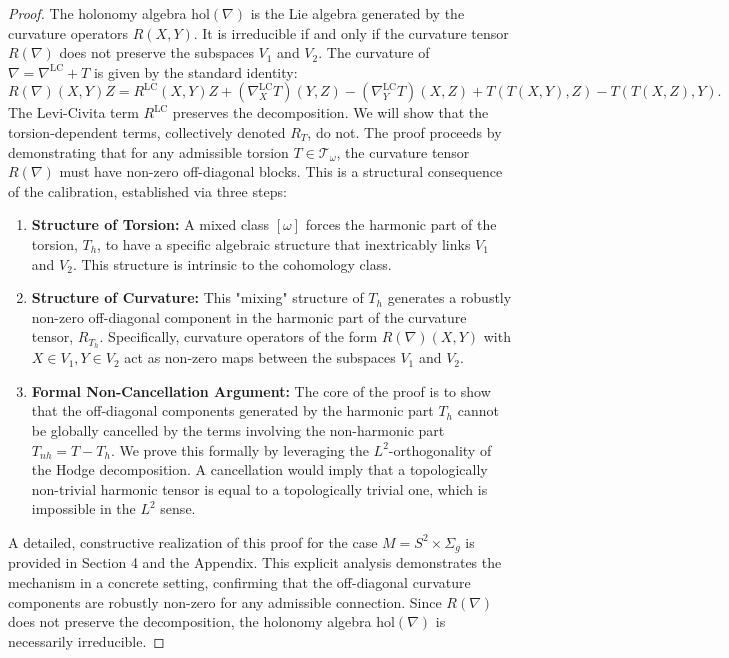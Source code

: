 \documentclass[12pt]{article}
\begin{document}
\begin{proof}
The holonomy algebra $\mathrm{hol}(\nabla)$ is the Lie algebra generated by the curvature operators $R(X,Y)$. It is irreducible if and only if the curvature tensor $R(\nabla)$ does not preserve the subspaces $V_1$ and $V_2$. The curvature of $\nabla = \nabla^{\mathrm{LC}} + T$ is given by the standard identity:
\begin{equation} \label{eq:full_curvature_decomposition}
R(\nabla)(X,Y)Z = R^{\mathrm{LC}}(X,Y)Z + (\nabla^{\mathrm{LC}}_X T)(Y,Z) - (\nabla^{\mathrm{LC}}_Y T)(X,Z) + T(T(X,Y),Z) - T(T(X,Z),Y).
\end{equation}
The Levi-Civita term $R^{\mathrm{LC}}$ preserves the decomposition. We will show that the torsion-dependent terms, collectively denoted $R_T$, do not. The proof proceeds by demonstrating that for any admissible torsion $T \in \mathcal{T}_\omega$, the curvature tensor $R(\nabla)$ must have non-zero off-diagonal blocks. This is a structural consequence of the calibration, established via three steps:
\begin{enumerate}
    \item \textbf{Structure of Torsion:} A mixed class $[\omega]$ forces the harmonic part of the torsion, $T_h$, to have a specific algebraic structure that inextricably links $V_1$ and $V_2$. This structure is intrinsic to the cohomology class.

    \item \textbf{Structure of Curvature:} This "mixing" structure of $T_h$ generates a robustly non-zero off-diagonal component in the harmonic part of the curvature tensor, $R_{T_h}$. Specifically, curvature operators of the form $R(\nabla)(X,Y)$ with $X \in V_1, Y \in V_2$ act as non-zero maps between the subspaces $V_1$ and $V_2$.

    \item \textbf{Formal Non-Cancellation Argument:} The core of the proof is to show that the off-diagonal components generated by the harmonic part $T_h$ cannot be globally cancelled by the terms involving the non-harmonic part $T_{nh} = T - T_h$. We prove this formally by leveraging the $L^2$-orthogonality of the Hodge decomposition. A cancellation would imply that a topologically non-trivial harmonic tensor is equal to a topologically trivial one, which is impossible in the $L^2$ sense.
\end{enumerate}
A detailed, constructive realization of this proof for the case $M=S^2 \times \Sigma_g$ is provided in Section 4 and the Appendix. This explicit analysis demonstrates the mechanism in a concrete setting, confirming that the off-diagonal curvature components are robustly non-zero for any admissible connection. Since $R(\nabla)$ does not preserve the decomposition, the holonomy algebra $\mathrm{hol}(\nabla)$ is necessarily irreducible.
\end{proof}
\end{document}
